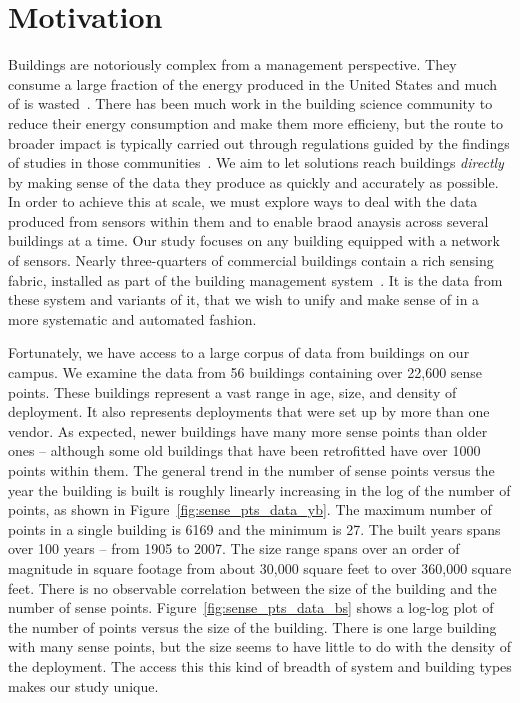 \section{Motivation}

Buildings are notoriously complex from a management perspective.  They consume a large fraction
of the energy produced in the United States and much of is wasted~\cite{epa}.  There has been
much work in the building science community to reduce their energy consumption and make them more
efficieny, but the route to broader impact is typically carried out through regulations guided
by the findings of studies in those communities~\cite{regulation}.
We aim to let solutions reach buildings \emph{directly} by making sense of the data they produce
as quickly and accurately as possible.
In order to achieve this at scale, we must explore ways to deal with the data produced
from sensors within them and to enable braod anaysis across several buildings at a time. Our study
focuses on any building equipped with a network of sensors.  Nearly 
three-quarters of commercial buildings contain a rich sensing fabric, installed as part
of the building management system~\cite{study}.  
It is the data from these system and variants of it, that
we wish to unify and make sense of in a more systematic and automated fashion.

Fortunately, we have access to a large corpus of data from buildings on our campus.
We examine the data from 56 buildings containing over 22,600 sense points. These buildings 
represent a vast range in age, size, and density of deployment.  It also represents deployments
that were set up by more than one vendor.  As expected, newer buildings have many more sense 
points than older ones -- although some old buildings that have been retrofitted have over 1000  
points within them. The general trend in the number of sense points versus the year the 
building is built is roughly linearly increasing in the log of the number of points, as shown
in Figure~\ref{fig:sense_pts_data_yb}.  
The maximum number of points in a 
single building is 6169 and the minimum is 27.   The built years spans over 100 years -- from 
1905 to 2007. The size range spans over an order of magnitude 
in square footage from about 30,000 square feet to over 360,000 square feet.  There is no
observable correlation between the size of the building and the number of sense points.
Figure~\ref{fig:sense_pts_data_bs} shows a log-log plot of the number of points versus
the size of the building.  There is one large building with many sense points, but the size
seems to have little to do with the density of the deployment.
The access this
this kind of breadth of system and building types makes our study unique.

